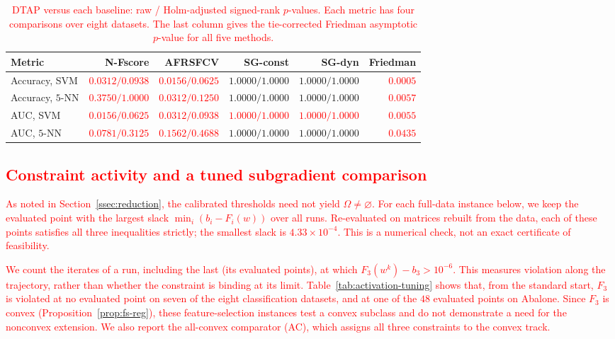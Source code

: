 \documentclass[]{interact}
\theoremstyle{plain}
\theoremstyle{definition}
\theoremstyle{remark}
\begin{document}
\begin{table}[htbp]
\centering\footnotesize\setlength{\tabcolsep}{4pt}
\caption{\textcolor{red}{DTAP versus each baseline: raw / Holm-adjusted signed-rank $p$-values. Each metric has four comparisons over eight datasets. The last column gives the tie-corrected Friedman asymptotic $p$-value for all five methods.}}\label{tab:wilcoxon}
\begin{tabular}{lrrrrr}
\toprule
Metric & N-Fscore & AFRSFCV & SG-const & SG-dyn & Friedman \\
\midrule
Accuracy, SVM & \leavevmode\textcolor{red}{$0.0312/0.0938$} & \leavevmode\textcolor{red}{$0.0156/0.0625$} & $1.0000/1.0000$ & $1.0000/1.0000$ & \leavevmode\textcolor{red}{$0.0005$} \\
Accuracy, $5$-NN & \leavevmode\textcolor{red}{$0.3750/1.0000$} & \leavevmode\textcolor{red}{$0.0312/0.1250$} & $1.0000/1.0000$ & $1.0000/1.0000$ & \leavevmode\textcolor{red}{$0.0057$} \\
AUC, SVM & \leavevmode\textcolor{red}{$0.0156/0.0625$} & \leavevmode\textcolor{red}{$0.0312/0.0938$} & \leavevmode\textcolor{red}{$1.0000/1.0000$} & \leavevmode\textcolor{red}{$1.0000/1.0000$} & \leavevmode\textcolor{red}{$0.0055$} \\
AUC, $5$-NN & \leavevmode\textcolor{red}{$0.0781/0.3125$} & \leavevmode\textcolor{red}{$0.1562/0.4688$} & $1.0000/1.0000$ & $1.0000/1.0000$ & \leavevmode\textcolor{red}{$0.0435$} \\
\bottomrule
\end{tabular}

\end{table}

\subsection{\textcolor{red}{Constraint activity and a tuned subgradient comparison}}
\label{ssec:feasibility-audit}

\leavevmode\textcolor{red}{As noted in Section~\ref{ssec:reduction}, the calibrated thresholds need not yield
$\Omega\ne\varnothing$. For each full-data instance below, we keep the evaluated point with the largest slack
$\min_i(b_i-F_i(w))$ over all runs. Re-evaluated on matrices rebuilt from the data, each of
these points satisfies all three inequalities strictly; the smallest slack is
$4.33\times10^{-4}$. This is a numerical check, not an exact certificate of feasibility.}

\leavevmode\textcolor{red}{We count the iterates of a run, including the last (its evaluated points), at which
$F_3(w^k)-b_3>10^{-6}$. This measures violation along the trajectory, rather than whether the
constraint is binding at its limit. Table~\ref{tab:activation-tuning} shows that, from the
standard start, $F_3$ is violated at no evaluated point on seven of the eight classification
datasets, and at one of the $48$ evaluated points on Abalone. Since $F_3$ is convex
(Proposition~\ref{prop:fs-reg}), these feature-selection instances test a convex subclass and
do not demonstrate a need for the nonconvex extension. We also report the all-convex
comparator (AC), which assigns all three constraints to the convex track.}
\end{document}
